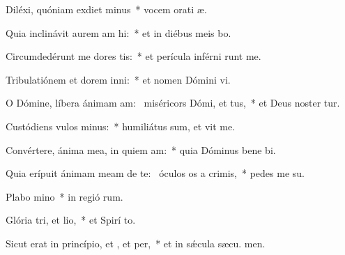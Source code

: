 \item Diléxi, quóniam exdiet minus~* vocem orati æ.
\item Quia inclinávit aurem am hi:~* et in diébus meis bo.
\item Circumdedérunt me dores tis:~* et perícula inférni runt me.
\item Tribulatiónem et dorem inni:~* et nomen Dómini vi.
\item O Dómine, líbera ánimam am:~\pscross{} miséricors Dómi, et tus,~* et Deus noster tur.
\item Custódiens vulos minus:~* humiliátus sum, et vit me.
\item Convértere, ánima mea, in quiem am:~* quia Dóminus bene bi.
\item Quia erípuit ánimam meam de te:~\pscross{} óculos os a crimis,~* pedes me  su.
\item Plabo mino~* in regió rum.
\item Glória tri, et lio,~* et Spirí to.
\item Sicut erat in princípio, et , et per,~* et in sǽcula sæcu. men.
